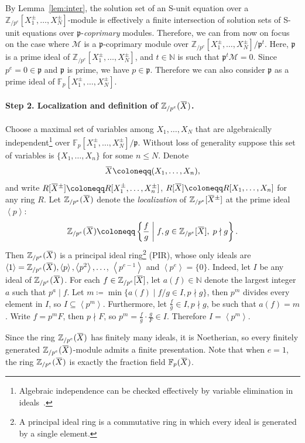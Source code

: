 \documentclass[letterpaper, 11pt, thm-restate]{article}
\numberwithin{equation}{section}
\newcommand{\N}{\mathbb{N}}
\newcommand{\F}{\mathbb{F}}
\newcommand{\Zpe}{\mathbb{Z}_{/p^e}}
\newcommand{\mM}{\mathcal{M}}
\newcommand{\gen}[1]{\left\langle {#1} \right\rangle}
\newcommand{\oX}{\mkern 1.5mu\overline{\mkern-1.5mu X \mkern-1.5mu}\mkern 1.5mu}
\newcommand{\frp}{\mathfrak{p}}
\theoremstyle{definition}
\theoremstyle{definition}
\theoremstyle{definition}
\begin{document}
By Lemma~\ref{lem:inter}, the solution set of an S-unit equation over a $\Zpe[X_1^{\pm}, \ldots, X_N^{\pm}]$-module is effectively a finite intersection of solution sets of S-unit equations over $\frp$-\emph{coprimary} modules.
Therefore, we can from now on focus on the case where $\mM$ is a $\frp$-coprimary module over $\Zpe[X_1^{\pm}, \ldots, X_N^{\pm}]/\frp^t$.
Here, $\frp$ is a prime ideal of $\Zpe[X_1^{\pm}, \ldots, X_N^{\pm}]$, and $t \in \N$ is such that $\frp^t \mM = 0$.
Since $p^e = 0 \in \frp$ and $\frp$ is prime, we have $p \in \frp$.
Therefore we can also consider $\frp$ as a prime ideal of $\F_p[X_1^{\pm}, \ldots, X_N^{\pm}]$.

\paragraph{Step 2. Localization and definition of $\Zpe(\oX)$.}

Choose a maximal set of variables among $X_1, \ldots, X_N$ that are algebraically independent\footnote{Algebraic independence can be checked effectively by variable elimination in ideals~\cite[Section~15.10.4]{eisenbud2013commutative}.} over $\F_p[X_1^{\pm}, \ldots, X_N^{\pm}]/\frp$. 
Without loss of generality suppose this set of variables is $\{X_1, \ldots, X_n\}$ for some $n \leq N$. 
Denote 
\[
\oX \coloneqq (X_1, \ldots, X_n),
\]
and write $R[\oX^{\pm}] \coloneqq R[X_1^{\pm}, \ldots, X_n^{\pm}]$, $R[\oX] \coloneqq R[X_1, \ldots, X_n]$ for any ring $R$.
Let $\Zpe(\oX)$ denote the \emph{localization} of $\Zpe[\oX^{\pm}]$ at the prime ideal $\gen{p}$:
\[
\Zpe(\oX) \coloneqq \left\{\frac{f}{g} \;\middle|\; f, g \in \Zpe[\oX],\; p \nmid g \right\}.
\]
Then $\Zpe(\oX)$ is a principal ideal ring\footnote{A principal ideal ring is a commutative ring in which every ideal is generated by a single element.} (PIR), whose only ideals are $\gen{1} = \Zpe(\oX), \gen{p}, \gen{p^2}, \ldots$, $\gen{p^{e-1}}$ and $\gen{p^e} = \{0\}$.
Indeed, let $I$ be any ideal of $\Zpe(\oX)$. For each $f \in \Zpe[\oX]$, let $a(f) \in \N$ denote the largest integer $a$ such that $p^{a} \mid f$.
Let $m \coloneqq \min\{a(f) \mid f/g \in I, p \nmid g\}$, then $p^m$ divides every element in $I$, so $I \subseteq \gen{p^m}$. Furthermore, let $\frac{f}{g} \in I, p \nmid g$, be such that $a(f) = m$. Write $f = p^mF$, then $p \nmid F$, so $p^m = \frac{f}{g} \cdot \frac{g}{F} \in I$.
Therefore $I = \gen{p^m}$.

Since the ring $\Zpe(\oX)$ has finitely many ideals, it is Noetherian, so every finitely generated $\Zpe(\oX)$-module admits a finite presentation.
Note that when $e = 1$, the ring $\Zpe(\oX)$ is exactly the fraction field $\F_p(\oX)$.
\end{document}
